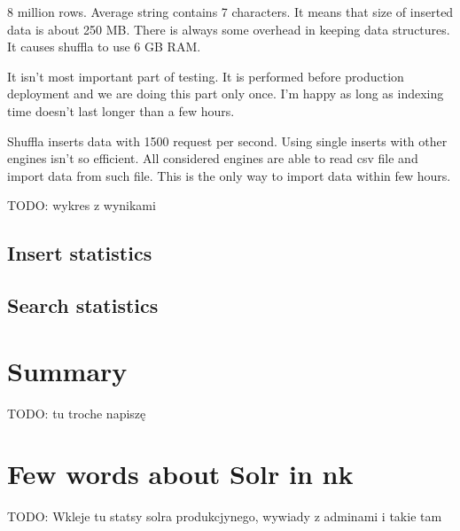 \documentclass[10pt,a4paper]{article}
\newcommand{\todo}[1]{\noindent\colorbox{myRed}{TODO: #1}}
\begin{document}
8 million rows. Average string contains 7 characters. It means that size of inserted data is about 250 MB. There is always some overhead in keeping data structures. It causes shuffla to use 6 GB RAM.

It isn't most important part of testing. It is performed before production deployment and we are doing this part only once. I'm happy as long as indexing time doesn't last longer than a few hours. 

Shuffla inserts data with 1500 request per second. Using single inserts with other engines isn't so efficient. All considered engines are able to read csv file and import data from such file. This is the only way to import data within few hours.

\todo{wykres z wynikami}

\subsection{Insert statistics}

\subsection{Search statistics}

\section{Summary}

\todo{tu troche napiszę}

\section{Few words about Solr in nk}

\todo{Wkleje tu statsy solra produkcjynego, wywiady z adminami i takie tam}

\end{document}
